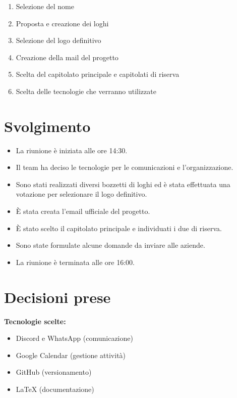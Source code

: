 \documentclass[a4paper,12pt]{article}
\begin{document}
\begin{enumerate}
    \item Selezione del nome
    \item Proposta e creazione dei loghi
    \item Selezione del logo definitivo
    \item Creazione della mail del progetto
    \item Scelta del capitolato principale e capitolati di riserva
    \item Scelta delle tecnologie che verranno utilizzate
\end{enumerate}

\section{Svolgimento}

\begin{itemize}
    \item La riunione è iniziata alle ore 14:30.
    \item Il team ha deciso le tecnologie per le comunicazioni e l'organizzazione.
    \item Sono stati realizzati diversi bozzetti di loghi ed è stata effettuata una votazione per selezionare il logo definitivo.
    \item È stata creata l'email ufficiale del progetto.
    \item È stato scelto il capitolato principale e individuati i due di riserva.
    \item Sono state formulate alcune domande da inviare alle aziende.
    \item La riunione è terminata alle ore 16:00.
\end{itemize}

\section{Decisioni prese}

\textbf{Tecnologie scelte:}
\begin{itemize}
    \item Discord e WhatsApp (comunicazione)
    \item Google Calendar (gestione attività)
    \item GitHub (versionamento)
    \item LaTeX (documentazione)
\end{itemize}
\end{document}
